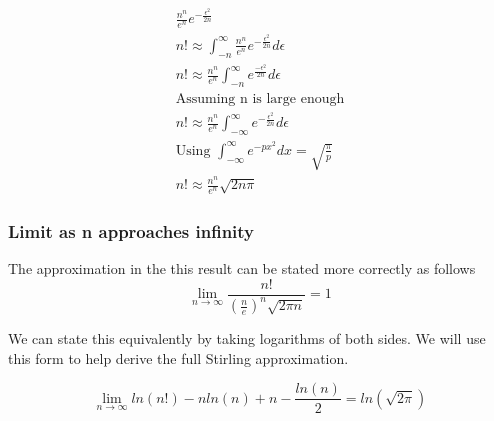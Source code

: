 \documentclass[a4paper]{article}
\begin{document}
\begin{theorem}
\begin{gather*}
            \frac{n^n}{e^n} e^{-\frac{\epsilon^2}{2n}}
            \\
            n!
            \approx
            \int_{-n}^{\infty} \frac{n^n}{e^n} e^{-\frac{\epsilon^2}{2n}} d\epsilon
            \\
            n!
            \approx
            \frac{n^n}{e^n}
            \int_{-n}^{\infty}  e^{\frac{-\epsilon^2}{2n}} d\epsilon
            \\
            \text{Assuming n is large enough}
            \\
            n!
            \approx
            \frac{n^n}{e^n}
            \int_{-\infty}^{\infty}  e^{-\frac{\epsilon^2}{2n}} d\epsilon
            \\
            \text{Using $\int_{-\infty}^{\infty}  e^{-px^2} dx = \sqrt{\frac{\pi}{p}}$}
            \\
            n!
            \approx
            \frac{n^n}{e^n} \sqrt{2n \pi}
        \end{gather*}
    \end{theorem}

    \subsubsection{Limit as n approaches infinity}

    The approximation in the this result can be stated more correctly as follows
    \begin{equation}
        \label{gf:eq:stirling_limit}
        \boxed{\lim_{n \to \infty} \frac{n!}{(\frac{n}{e})^n \sqrt{2\pi n}} = 1
        }
    \end{equation}

    We can state this equivalently by taking logarithms of both sides.
    We will use this form to help derive the full Stirling approximation.

    \begin{equation}
        \label{gf:eq:stirling-limit-log}
        \boxed{\lim_{n \to \infty}
            ln(n!) - nln(n) + n - \frac{ln(n)}{2}= ln(\sqrt{2\pi})
        }
    \end{equation}
\end{document}

